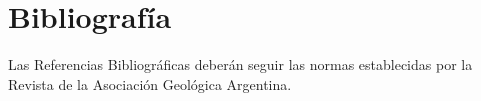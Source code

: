 \setcounter{figure}{0} %
\renewcommand{\thefigure}{\thesection.\arabic{figure}}
\section*{\Large Bibliografía}
Las Referencias Bibliográficas deberán seguir las normas establecidas por la Revista de la Asociación Geológica Argentina. 
